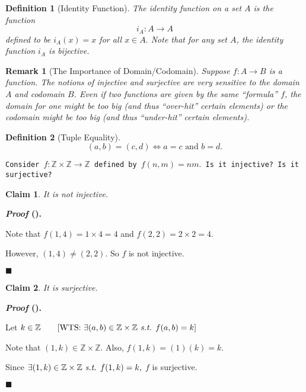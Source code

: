 \documentclass[12pt,a4paper]{article}
\newtheorem{df}{Definition}[subsection]
\newtheorem{clm}{Claim}[subsection]
\newcounter{nprf}[subsection]
\newtheorem*{rmk}{\indent Remark}
\newenvironment*{prf}{\par\indent\textbf{\textit{Proof} (\stepcounter{nprf}\thenprf). }\par }{\par\hfill $\blacksquare$\par}
\def\Z{{\mathbb{Z}}}
\def\st{\emph{ s.t. }}
\begin{document}
\begin{df}[Identity Function]
	The identity function on a set $A$ is the function \[i_A: A\to A\] defined to be $i_A(x)=x$ for all $x\in A.$ Note that for any set $A$, the identity function $i_A$ is bijective. 
\end{df}
\begin{rmk}[The Importance of Domain/Codomain]
	Suppose $f:A\to B$ is a function. The notions of injective and surjective are \textit{very} sensitive to the domain $A$ and codomain $B$. Even if two functions are given by the same ``formula'' $f$, the domain for one might be too big (\textit{and thus ``over-hit'' certain elements}) or the codomain might be too big (\textit{and thus ``under-hit'' certain elements}).	
\end{rmk}
\begin{df}[Tuple Equality]
	\[(a,b)=(c,d)\iff a=c\text{ and }b=d.\]
\end{df}
\begin{framed}
\noindent\texttt{Consider $f:\Z\times\Z\to\Z$ defined by $f(n,m)=nm.$ Is it injective? Is it surjective?}
\begin{clm} It is not injective.\end{clm}
\begin{prf}
	Note that $f(1,4)=1\times4=4$ and $f(2,2)=2\times2=4.$\par However, $(1,4)\neq(2,2).$ So $f$ is not injective. 
\end{prf}
\begin{clm} It is surjective.\end{clm}	
\begin{prf}
	Let $k\in\Z\qquad[\text{WTS: }\exists(a,b)\in\Z\times\Z\st f(a,b)=k]$\par Note that $(1,k)\in\Z\times\Z.$ Also, $f(1,k)=(1)(k)=k.$\par Since $\exists(1,k)\in\Z\times\Z\st f(1,k)=k,$ $f$ is surjective. 
\end{prf}
\end{framed}
\end{document}
